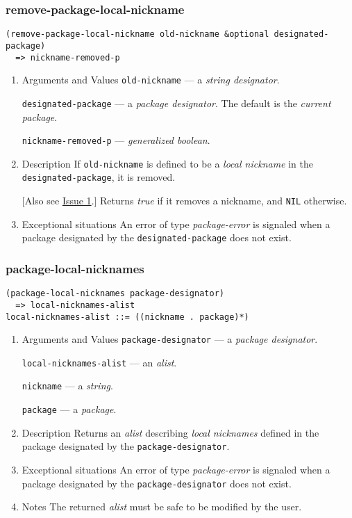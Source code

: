 \documentclass[11pt]{article}
\begin{document}
\subsubsection{remove-package-local-nickname}
\label{sec:orgc4ecab2}
\begin{verbatim}
(remove-package-local-nickname old-nickname &optional designated-package)
  => nickname-removed-p
\end{verbatim}
\begin{enumerate}
\item Arguments and Values
\label{sec:org353616e}
\texttt{old-nickname} --- a \emph{string designator}.

\texttt{designated-package} --- a \emph{package designator}.
The default is the \emph{current package}.

\texttt{nickname-removed-p} --- \emph{generalized boolean}.
\item Description
\label{sec:org2577866}
If \texttt{old-nickname} is defined to be a \emph{local nickname} in the \texttt{designated-package},
it is removed.

[Also see \hyperref[sec:org0a8d60e]{Issue 1}.] Returns \emph{true} if it removes a nickname, and \texttt{NIL} otherwise.
\item Exceptional situations
\label{sec:org43f5030}
An error of type \emph{package-error} is signaled when a package designated by the
\texttt{designated-package} does not exist.
\end{enumerate}
\subsubsection{package-local-nicknames}
\label{sec:org88c957d}
\begin{verbatim}
(package-local-nicknames package-designator)
  => local-nicknames-alist
local-nicknames-alist ::= ((nickname . package)*)
\end{verbatim}
\begin{enumerate}
\item Arguments and Values
\label{sec:orgbe39964}
\texttt{package-designator} --- a \emph{package designator}.

\texttt{local-nicknames-alist} --- an \emph{alist}.

\texttt{nickname} --- a \emph{string}.

\texttt{package} --- a \emph{package}.
\item Description
\label{sec:org7069520}
Returns an \emph{alist} describing \emph{local nicknames} defined in the package designated
by the \texttt{package-designator}.
\item Exceptional situations
\label{sec:org740c9a7}
An error of type \emph{package-error} is signaled when a package designated by the
\texttt{package-designator} does not exist.
\item Notes
\label{sec:org3405fb0}
The returned \emph{alist} must be safe to be modified by the user.
\end{enumerate}
\end{document}
